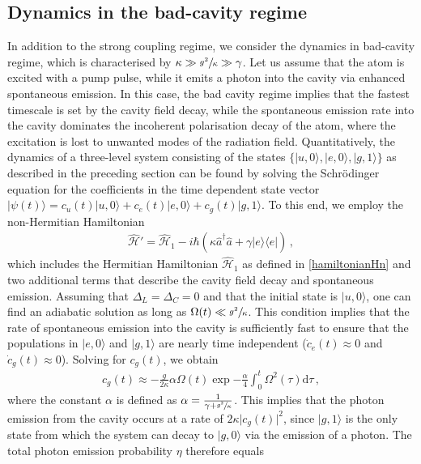 \documentclass[../Thesis-IJspeert.tex]{subfiles}
\begin{document}
\subsection{Dynamics in the bad-cavity regime}
In addition to the strong coupling regime, we consider the dynamics in bad-cavity regime, which is characterised by $\kappa \gg \sfrac{g^2}{\kappa} \gg \gamma $. Let us assume that the atom is excited with a pump pulse, while it emits a photon into the cavity via enhanced spontaneous emission. In this case, the bad cavity regime implies that the fastest timescale is set by the cavity field decay, while the spontaneous emission rate into the cavity dominates the incoherent polarisation decay of the atom, where the excitation is lost to unwanted modes of the radiation field. Quantitatively, the dynamics of a three-level system consisting of the states $\{ \vert u, 0 \rangle, \vert e, 0 \rangle, \vert g, 1 \rangle \}$ as described in the preceding section can be found by solving the Schr\"{o}dinger equation for the coefficients in the time dependent state vector $\vert \psi (t) \rangle = c_u(t)\vert u,0\rangle+c_e(t)\vert e, 0 \rangle + c_g(t) \vert g,1\rangle$. To this end, we employ the non-Hermitian Hamiltonian
\begin{align}
	\hat{\mathcal{H}}' = \hat{\mathcal{H}}_1 - i \hbar (\kappa \hat{a}^\dagger\hat{a}+\gamma \vert e \rangle\langle e \vert)\,,
\end{align}
which includes the Hermitian Hamiltonian $\hat{\mathcal{H}}_1$ as defined in \autoref{hamiltonianHn} and two additional terms that describe the cavity field decay and spontaneous emission. Assuming that $\Delta_L=\Delta_C=0$ and that the initial state is $\vert u, 0\rangle$, one can find an adiabatic solution as long as $\Omega(t)\ll \sfrac{g^2}{\kappa}$. This condition implies that the rate of spontaneous emission into the cavity is sufficiently fast to ensure that the populations in $\vert e,0\rangle$ and $\vert g, 1 \rangle$ are nearly time independent ($\dot{c}_e(t)\approx 0 $ and $\dot{c}_g(t)\approx 0$). Solving for $c_g(t)$, we obtain
\begin{align}
	c_g(t)\approx-\frac{g}{2\kappa} \alpha \Omega(t) \exp{-\frac{\alpha}{4} \int_{0}^{t} \Omega^2(\tau) \mathrm{d}\tau}\,,
\end{align} 
where the constant $\alpha$ is defined as $\alpha=\frac{1}{\gamma+\sfrac{g^2}{\kappa}}$. This implies that the photon emission from the cavity occurs at a rate of $2\kappa \vert c_g(t)\vert^2$, since $\vert g, 1 \rangle$ is the only state from which the system can decay to $\vert g, 0 \rangle$ via the emission of a photon. The total photon emission probability $\eta$ therefore equals
\end{document}
